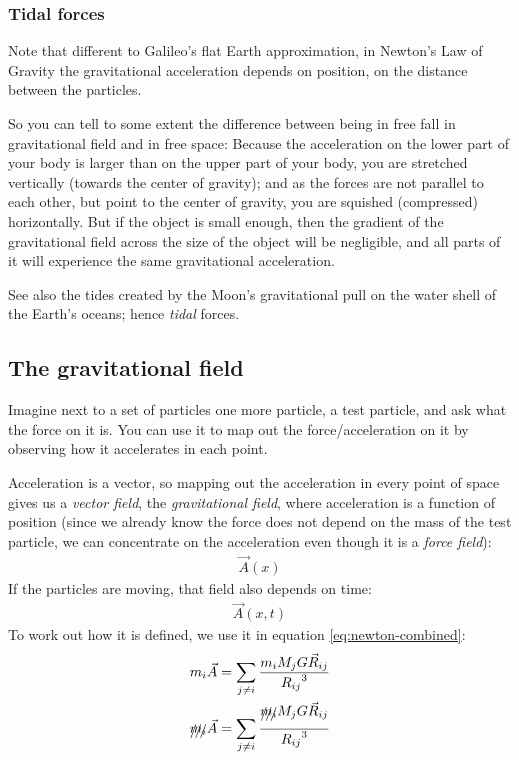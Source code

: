 \documentclass[pagesize,headsepline,10pt,parskip=half,BCOR=12mm]{scrreprt}
\begin{document}
        \subsubsection{Tidal forces}
          Note that different to Galileo's flat Earth approximation,
          in Newton's Law of Gravity the gravitational acceleration
          depends on position, on the distance between the particles.

          So you can tell to some extent the difference between
          being in free fall in gravitational field and in free
          space:
          Because the acceleration on the lower part of your body
          is larger than on the upper part of your body, you are
          stretched vertically (towards the center of gravity); and
          as the forces are not parallel to each other, but point
          to the center of gravity, you are squished
          (compressed) horizontally.
          But if the object is small enough, then the gradient of
          the gravitational field across the size of the object
          will be negligible, and all parts of it will experience
          the same gravitational acceleration.

          See also the tides created by the Moon's gravitational
          pull on the water shell of the Earth's oceans; hence
          \emph{tidal} forces.

      \subsection{The gravitational field}
        Imagine next to a set of particles one more particle, a
        test particle, and ask what the force on it is. You can use
        it to map out the force/acceleration on it by observing how
        it accelerates in each point.

        Acceleration is a vector, so mapping out the acceleration
        in every point of space gives us a \emph{vector field}, the
        \emph{gravitational field}, where acceleration is a
        function of position (since we already know the force does
        not depend on the mass of the test particle, we can
        concentrate on the acceleration even though it is a
        \emph{force field}):
        \begin{align*}
          \vec A(x)
        \end{align*}
        If the particles are moving, that field also depends on
        time:
        \begin{align*}
          \vec A(x, t)
        \end{align*}
        To work out how it is defined, we use it in equation
        \ref{eq:newton-combined}:
        \begin{align}
          m_i \vec A &= \sum_{j \neq i}{\frac{m_i
          M_jG\vec R_{ij}}{{R_{ij}}^3}} \\
          \xout{m_i} \vec A &= \sum_{j \neq i}{\frac{\xout{m_i}
          M_jG\vec R_{ij}}{{R_{ij}}^3}}
        \end{align}
\end{document}
